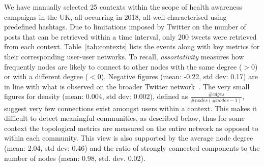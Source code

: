 \documentclass[runningheads]{llncs}
\begin{document}
We have manually selected 25 contexts within the scope of health awareness campaigns in the UK, all occurring in 2018, all well-characterised using predefined hashtags.
Due to limitations imposed by Twitter on the number of posts that can be retrieved within a time interval, only $200$ tweets were retrieved from each context.
 Table~\ref{tab:contexts} lists the events along with key metrics for their corresponding user-user networks. 
To recall, \textit{assortativity} measures how frequently nodes are likely to connect to other nodes with the same degree ($>0$) or with a different degree ($<0$). 
Negative figures (mean: -0.22, std dev: 0.17) are in line with what is observed on the broader Twitter network~\cite{Fisher2017}.
%
The very small figures for density (mean: 0.004, std dev: 0.002), defined as $\frac{\#edges }{\mathit{\mathit{\#nodes}} (\mathit{\#nodes} -1)}$, suggest very few connections exist amongst users within a context. 
This makes it difficult to detect meaningful communities, as described below, thus for some context the topological metrics are measured on the entire network as opposed to within each community.
This view is also supported by the average node degree (mean: 2.04, std dev: 0.46) and the ratio of strongly connected components to the number of nodes (mean: 0.98, std. dev. 0.02).
\end{document}

